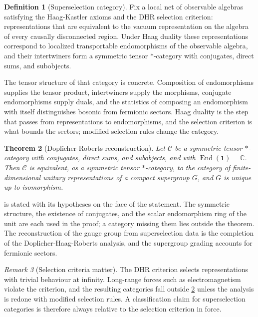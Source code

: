 \documentclass[11pt,letterpaper]{article}
\newtheorem{theorem}{Theorem}[section]
\theoremstyle{definition}
\newtheorem{definition}[theorem]{Definition}
\theoremstyle{remark}
\newtheorem{remark}[theorem]{Remark}
\begin{document}
\begin{definition}[Superselection category]
\label{def:dhr}
Fix a local net of observable algebras satisfying the Haag-Kastler axioms and the DHR selection criterion: representations that are equivalent to the vacuum representation on the algebra of every causally disconnected region. Under Haag duality these representations correspond to localized transportable endomorphisms of the observable algebra, and their intertwiners form a symmetric tensor $*$-category with conjugates, direct sums, and subobjects.
\end{definition}

The tensor structure of that category is concrete. Composition of endomorphisms supplies the tensor product, intertwiners supply the morphisms, conjugate endomorphisms supply duals, and the statistics of composing an endomorphism with itself distinguishes bosonic from fermionic sectors. Haag duality is the step that passes from representations to endomorphisms, and the selection criterion is what bounds the sectors; modified selection rules change the category.

\begin{theorem}[Doplicher-Roberts reconstruction]
\label{thm:dr}
Let $\mathcal{C}$ be a symmetric tensor $*$-category with conjugates, direct sums, and subobjects, and with $\operatorname{End}(\mathbf{1}) = \mathbb{C}$. Then $\mathcal{C}$ is equivalent, as a symmetric tensor $*$-category, to the category of finite-dimensional unitary representations of a compact supergroup $G$, and $G$ is unique up to isomorphism.
\end{theorem}

 is stated with its hypotheses on the face of the statement. The symmetric structure, the existence of conjugates, and the scalar endomorphism ring of the unit are each used in the proof; a category missing them lies outside the theorem. The reconstruction of the gauge group from superselection data is the completion of the Doplicher-Haag-Roberts analysis, and the supergroup grading accounts for fermionic sectors.

\begin{remark}[Selection criteria matter]
\label{rem:selection}
The DHR criterion selects representations with trivial behaviour at infinity. Long-range forces such as electromagnetism violate the criterion, and the resulting categories fall outside \cref{thm:dr} unless the analysis is redone with modified selection rules. A classification claim for superselection categories is therefore always relative to the selection criterion in force.
\end{remark}
\end{document}
